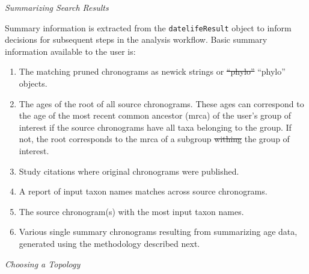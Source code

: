 \documentclass[english,man]{apa6} %
\providecommand{\tightlist}{%
  \setlength{\itemsep}{0pt}\setlength{\parskip}{0pt}}
\providecommand{\DIFaddtex}[1]{{\protect\color{blue}\uwave{#1}}} %
\providecommand{\DIFdeltex}[1]{{\protect\color{red}\sout{#1}}}                      %
\providecommand{\DIFaddbegin}{} %
\providecommand{\DIFaddend}{} %
\providecommand{\DIFdelbegin}{} %
\providecommand{\DIFdelend}{} %
\providecommand{\DIFadd}[1]{\texorpdfstring{\DIFaddtex{#1}}{#1}} %
\providecommand{\DIFdel}[1]{\texorpdfstring{\DIFdeltex{#1}}{}} %
\newcommand{\DIFscaledelfig}{0.5}
\newlength{\DIFdelgraphicswidth} %
\newlength{\DIFdelgraphicsheight} %
\newcommand{\DIFaddincludegraphics}[2][]{{\color{blue}\fbox{\DIFOincludegraphics[#1]{#2}}}} %
\newcommand{\DIFdelincludegraphics}[2][]{%
\sbox{\DIFdelgraphicsbox}{\DIFOincludegraphics[#1]{#2}}%
\settoboxwidth{\DIFdelgraphicswidth}{\DIFdelgraphicsbox} %
\settoboxtotalheight{\DIFdelgraphicsheight}{\DIFdelgraphicsbox} %
\scalebox{\DIFscaledelfig}{%
\parbox[b]{\DIFdelgraphicswidth}{\usebox{\DIFdelgraphicsbox}\\[-\baselineskip] \rule{\DIFdelgraphicswidth}{0em}}\llap{\resizebox{\DIFdelgraphicswidth}{\DIFdelgraphicsheight}{%
\setlength{\unitlength}{\DIFdelgraphicswidth}%
\begin{picture}(1,1)%
\thicklines\linethickness{2pt} %
{\color[rgb]{1,0,0}\put(0,0){\framebox(1,1){}}}%
{\color[rgb]{1,0,0}\put(0,0){\line( 1,1){1}}}%
{\color[rgb]{1,0,0}\put(0,1){\line(1,-1){1}}}%
\end{picture}%
}\hspace*{3pt}}} %
} %
\DeclareRobustCommand{\DIFaddbegin}{\DIFOaddbegin \let\includegraphics\DIFaddincludegraphics} %
\DeclareRobustCommand{\DIFaddend}{\DIFOaddend \let\includegraphics\DIFOincludegraphics} %
\DeclareRobustCommand{\DIFdelbegin}{\DIFOdelbegin \let\includegraphics\DIFdelincludegraphics} %
\DeclareRobustCommand{\DIFdelend}{\DIFOaddend \let\includegraphics\DIFOincludegraphics} %
\begin{document}
\begin{center}
\emph{Summarizing Search Results}
\end{center}

Summary information is extracted from the \texttt{datelifeResult} object to inform decisions for subsequent steps in the analysis workflow. Basic summary information available to the user is:

\begin{enumerate}
\def\labelenumi{\arabic{enumi}.}
\tightlist
\item
  The matching pruned chronograms as newick strings or \DIFdelbegin \DIFdel{``phylo'' }\DIFdelend \DIFaddbegin \enquote{phylo} \DIFaddend objects.
\item
  The ages of the root of all source chronograms. These ages can correspond to the age of the most recent common ancestor (mrca) of the user's group of interest if the source chronograms have all taxa belonging to the group. If not, the root corresponds to the mrca of a subgroup \DIFdelbegin \DIFdel{withing }\DIFdelend \DIFaddbegin \DIFadd{within }\DIFaddend the group of interest.
\item
  Study citations where original chronograms were published.
\item
  A report of input taxon names matches across source chronograms.
\item
  The source chronogram(s) with the most input taxon names.
\item
  Various single summary chronograms resulting from summarizing age data, generated using the methodology described next.
\end{enumerate}

\begin{center}
\emph{Choosing a Topology}
\end{center}
\end{document}
